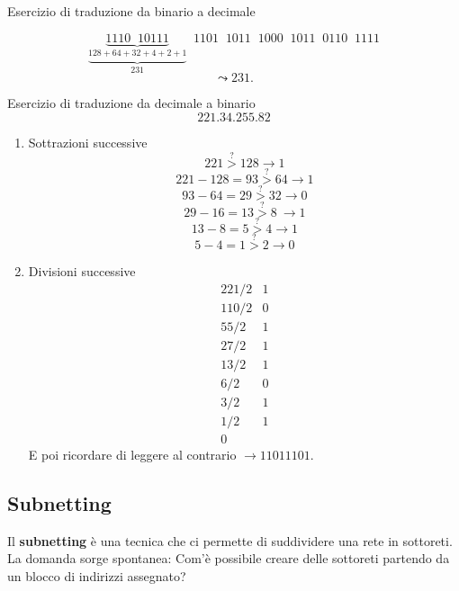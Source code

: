 \documentclass[a4paper]{article}
\begin{document}
\begin{examplebox}{Esercizio di traduzione da binario a decimale}

    \[\underbrace{\underbrace{1110 \;\; 10111}_{128 + 64 + 32 + 4 + 2 + 1}}_{231}\;\;  1101\;\;  1011 \;\; 1000 \;\; 1011\;\;  0110\;\;  1111\]
    \[\leadsto 231.\]
\end{examplebox}
\begin{examplebox}{Esercizio di traduzione da decimale a binario}
    \[221.34.255.82\]
    \begin{enumerate}
        \item Sottrazioni successive
        \[221 \stackrel{?}{>} 128 \rightarrow 1\]
        \[221 - 128 = 93 \stackrel{?}{>} 64 \rightarrow 1\]
        \[93 - 64 = 29 \stackrel{?}{>} 32 \rightarrow 0\]
        \[29 - 16 = 13 \stackrel{?}{>} 8\ \rightarrow 1\]
        \[13 - 8 = 5 \stackrel{?}{>} 4 \rightarrow 1\]
        \[5 - 4 = 1 \stackrel{?}{>} 2 \rightarrow 0\]
        \item Divisioni successive
        \[\begin{matrix}
            221/2 & 1\\
            110/2 & 0\\
            55/2 & 1\\
            27/2 & 1\\
            13/2 & 1\\
            6/2 & 0\\
            3/2 & 1\\
            1/2 & 1\\
            0
        \end{matrix}
        \]
        E poi ricordare di leggere al contrario $\rightarrow 11011101$.
    \end{enumerate}
\end{examplebox}

\subsection{Subnetting}

Il \textbf{subnetting} è una tecnica che ci permette di suddividere una rete in sottoreti. La domanda sorge spontanea: Com'è possibile creare delle sottoreti partendo da un blocco di indirizzi assegnato? 
\end{document}
